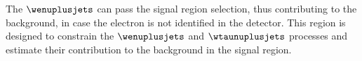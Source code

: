 The $\wenuplusjets$ can pass the signal region selection, thus contributing to
the background, in case the electron is not identified in the detector. This
region is designed to constrain the $\wenuplusjets$ and $\wtaunuplusjets$
processes and estimate their contribution to the background in the signal
region.
